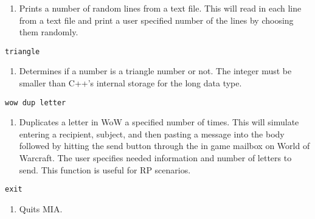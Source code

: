 \begin{enumerate}
	\item[]  Prints a number of random lines from a text file. This will read in each line from a text file and print a user specified number of the lines by choosing them randomly.
\end{enumerate}
\begin{lstlisting} 
triangle   
\end{lstlisting}
\begin{enumerate}
	\item[] Determines if a number is a triangle number or not. The integer must be smaller than C++'s internal storage for the long data type.
\end{enumerate}
\begin{lstlisting} 
wow dup letter
\end{lstlisting}
\begin{enumerate}
	\item[] Duplicates a letter in WoW a specified number of times. This will simulate entering a recipient, subject, and then pasting a message into the body followed by hitting the send button through the in game mailbox on World of Warcraft. The user specifies needed information and number of letters to send. This function is useful for RP scenarios.
\end{enumerate}
\begin{lstlisting} 
exit  
\end{lstlisting}
\begin{enumerate}
	\item[] Quits MIA. 
\end{enumerate}